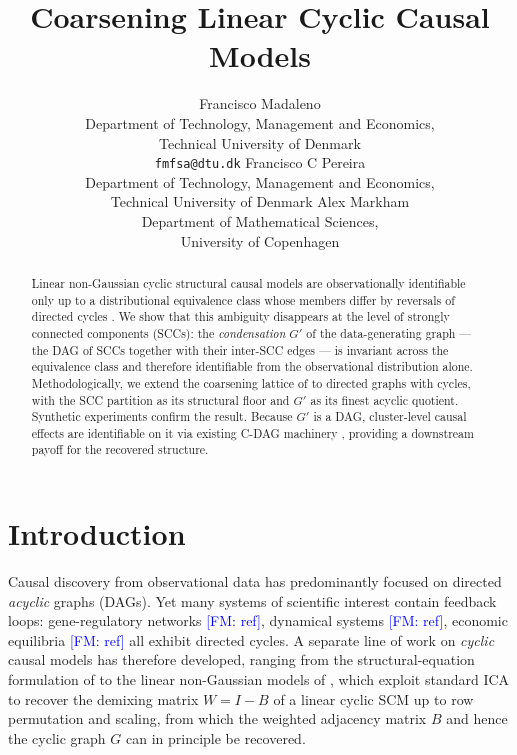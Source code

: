 \documentclass{article}
\title{Coarsening Linear Cyclic Causal Models}
\author{
    Francisco Madaleno \\
    Department of Technology, Management and Economics,\\
    Technical University of Denmark \\
    \texttt{fmfsa@dtu.dk}
    \AND
    Francisco C Pereira \\
    Department of Technology, Management and Economics,\\
    Technical University of Denmark
    \And
    Alex Markham \\
    Department of Mathematical Sciences,\\
    University of Copenhagen
}
\newcommand{\fransays}[1]{\textcolor{blue}{[FM: #1]}}
\begin{document}
\maketitle


\begin{abstract}
Linear non-Gaussian cyclic structural causal models are observationally identifiable only up to a distributional equivalence class whose members differ by reversals of directed cycles \citep{lacerda2008discovering}. We show that this ambiguity disappears at the level of strongly connected components (SCCs): the \emph{condensation} $G'$ of the data-generating graph --- the DAG of SCCs together with their inter-SCC edges --- is invariant across the equivalence class and therefore identifiable from the observational distribution alone. Methodologically, we extend the coarsening lattice of \citet{wahl2024foundations,madaleno2026coarsening} to directed graphs with cycles, with the SCC partition as its structural floor and $G'$ as its finest acyclic quotient. Synthetic experiments confirm the result. Because $G'$ is a DAG, cluster-level causal effects are identifiable on it via existing C-DAG machinery \citep{anand2023causal}, providing a downstream payoff for the recovered structure.
\end{abstract}



\section{Introduction}

Causal discovery from observational data has predominantly focused on directed \emph{acyclic} graphs (DAGs). Yet many systems of scientific interest contain feedback loops: gene-regulatory networks \fransays{ref}, dynamical systems \fransays{ref}, economic equilibria \fransays{ref} all exhibit directed cycles. A separate line of work on \emph{cyclic} causal models has therefore developed, ranging from the structural-equation formulation of \citet{spirtes1995directed,bongers2021foundations} to the linear non-Gaussian models of \citet{lacerda2008discovering}, which exploit standard ICA \citep{eriksson2004identifiability} to recover the demixing matrix $W = I - B$ of a linear cyclic SCM up to row permutation and scaling, from which the weighted adjacency matrix $B$ and hence the cyclic graph $G$ can in principle be recovered.
\end{document}
